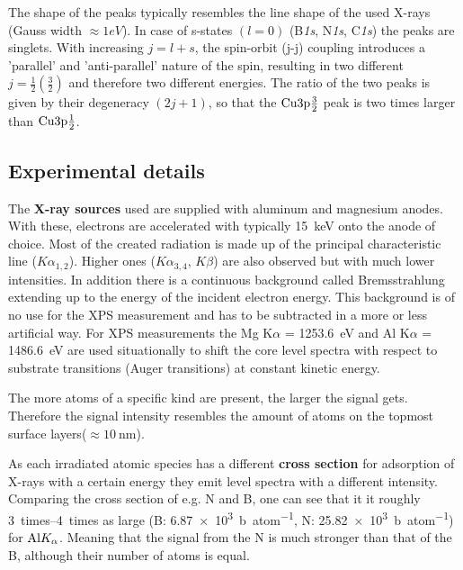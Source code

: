 The shape of the peaks typically resembles the line shape of the used X-rays (Gauss width $\approx 1eV$). In case of s-states $(l=0)$ (B\textit{1s}, N\textit{1s}, C\textit{1s}) the peaks are singlets. With increasing $j=l+s$, the spin-orbit (j-j) coupling introduces a 'parallel' and 'anti-parallel' nature of the spin, resulting in two different $j=\frac{1}{2}(\frac{3}{2})$ and therefore two different energies.
The ratio of the two peaks is given by their degeneracy $(2j+1)$\cite[113]{Riviere_90}, so that the $\textnormal{Cu3p}\frac{3}{2}$ peak is two times larger than $\textnormal{Cu3p}\frac{1}{2}$.

\subsection{Experimental details}
The \textbf{X-ray sources} used are supplied with aluminum and magnesium anodes.
With these, electrons are accelerated with typically \SI{15}{\keV} onto the anode of choice. Most of the created radiation is made up of the principal characteristic line ($K\alpha_{1,2}$). Higher ones ($K\alpha_{3,4}$, $K\beta$) are also observed but with much lower intensities. In addition there is a continuous background called Bremsstrahlung extending up to the energy of the incident electron energy. This background is of no use for the XPS measurement and has to be subtracted in a more or less artificial way. For XPS measurements the Mg K$\alpha$ = \SI{1253.6}{\eV} and Al K$\alpha$ = \SI{1486.6}{\eV} are used situationally to shift the core level spectra with respect to substrate transitions (Auger transitions) at constant kinetic energy.

The more atoms of a specific kind are present, the larger the signal gets. Therefore the signal intensity resembles the amount of atoms on the topmost surface layers($\approx \SI{10}{\nm}$).

As each irradiated atomic species has a different \textbf{cross section} for adsorption of X-rays with a certain energy they emit level spectra with a different intensity. Comparing the cross section of e.g. N and B, one can see that it it roughly \SIrange{3}{4}{times} as large (B: \SI{6,87e3}{\barn\per atom}, N: \SI{25,82e3}{\barn\per atom}) for $\textnormal{Al} K_{\alpha}$\cite{henke_x-ray_1993}. Meaning that the signal from the N is much stronger than that of the B, although their number of atoms is equal.

